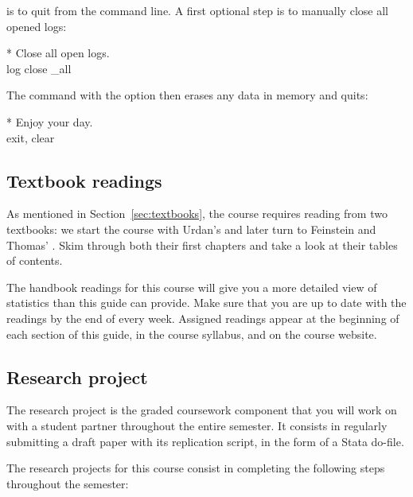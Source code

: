 \begin{mybox}%
   is to quit from the command line. A first optional step is to manually close all opened logs:%

	\begin{docspec}
		* Close all open logs.\\%
		log close \_all
  \end{docspec}
  
  The  command with the  option then erases any data in memory and quits:%
  
  \begin{docspec}
		* Enjoy your day.\\%
		exit, clear
	\end{docspec}
\end{mybox}

\subsection{Textbook readings}

As mentioned in Section~\ref{sec:textbooks}, the course requires reading from two textbooks: we start the course with Urdan's  and later turn to Feinstein and Thomas' . Skim through both their first chapters and take a look at their tables of contents.%

The handbook readings for this course will give you a more detailed view of statistics than this guide can provide. Make sure that you are up to date with the readings by the end of every week. Assigned readings appear at the beginning of each section of this guide, in the course syllabus, and on the course website.%

\subsection{Research project}

The research project is the graded coursework component that you will work on with a student partner throughout the entire semester. It consists in regularly submitting a draft paper with its replication script, in the form of a Stata do-file.%

The research projects for this course consist in completing the following steps throughout the semester:%

